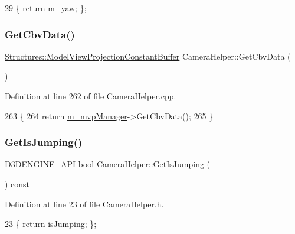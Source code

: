 \begin{DoxyCode}
29 \{ \textcolor{keywordflow}{return} \mbox{\hyperlink{class_camera_helper_a9bdda4839839b4329188fc44517e8b01}{m\_yaw}}; \};
\end{DoxyCode}
\mbox{\label{class_camera_helper_a52e1cde25a6b6486dc9df5f25ae695d2}} 
\subsubsection{\texorpdfstring{Get\+Cbv\+Data()}{GetCbvData()}}
{\footnotesize\ttfamily \mbox{\hyperlink{struct_structures_1_1_model_view_projection_constant_buffer}{Structures\+::\+Model\+View\+Projection\+Constant\+Buffer}} Camera\+Helper\+::\+Get\+Cbv\+Data (\begin{DoxyParamCaption}{ }\end{DoxyParamCaption})}



Definition at line 262 of file Camera\+Helper.\+cpp.


\begin{DoxyCode}
263 \{
264     \textcolor{keywordflow}{return} \mbox{\hyperlink{class_camera_helper_a10d96783299a8c958f84d46542a3d93f}{m\_mvpManager}}->GetCbvData();
265 \}
\end{DoxyCode}
\mbox{\label{class_camera_helper_a1801645e4919706fe53c2d8bc2683933}} 
\subsubsection{\texorpdfstring{Get\+Is\+Jumping()}{GetIsJumping()}}
{\footnotesize\ttfamily \mbox{\hyperlink{stdafx_8h_a8ee2d990c5dfba7794dd2b60741d7722}{D3\+D\+E\+N\+G\+I\+N\+E\+\_\+\+A\+PI}} bool Camera\+Helper\+::\+Get\+Is\+Jumping (\begin{DoxyParamCaption}{ }\end{DoxyParamCaption}) const\hspace{0.3cm}{\ttfamily [inline]}}



Definition at line 23 of file Camera\+Helper.\+h.


\begin{DoxyCode}
23 \{ \textcolor{keywordflow}{return} \mbox{\hyperlink{class_camera_helper_ac0dd816f2a5e8b4030b62e703ab92861}{isJumping}}; \};
\end{DoxyCode}
\mbox{\label{class_camera_helper_a142721c2285930e8fa5f5674c6196688}} 
